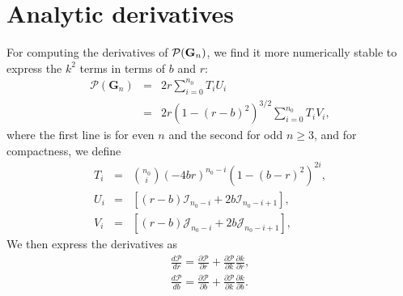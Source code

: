 \documentclass[modern]{aastex61}
\begin{document}
\section{Analytic derivatives}

For computing the derivatives of $\mathcal{P}({\mathbf{G}}_n)$, we find it more numerically 
stable to express the $k^2$ terms in terms of $b$ and $r$:
\begin{eqnarray}
\mathcal{P}(\mathbf{G}_n) &=& 2r \sum_{i=0}^{n_0} T_i U_i\\
&=& 2r(1-(r-b)^2)^{3/2} \sum_{i=0}^{n_0} T_i V_i,
\end{eqnarray}
where the first line is for even $n$ and the second for odd $n \ge 3$, and
for compactness, we define
\begin{eqnarray}
T_i &=&  \binom{n_0}{i}(-4br)^{n_0-i}(1-(b-r)^2)^{2i},\\
U_i &=&  \left[(r-b)\mathcal{I}_{n_0-i} + 2b \mathcal{I}_{n_0-i+1}\right],\\
V_i &=&  \left[(r-b)\mathcal{J}_{n_0-i} + 2b \mathcal{J}_{n_0-i+1}\right],
\end{eqnarray}
We then express the derivatives as
\begin{eqnarray}
\frac{d \mathcal{P}}{d r} = \frac{\partial \mathcal{P}}{\partial r}  +  \frac{\partial \mathcal{P}}{\partial k} \frac{\partial k}{\partial r},\\
\frac{d \mathcal{P}}{d b} = \frac{\partial \mathcal{P}}{\partial b}  +  \frac{\partial \mathcal{P}}{\partial k} \frac{\partial k}{\partial b}.
\end{eqnarray}
\end{document}
